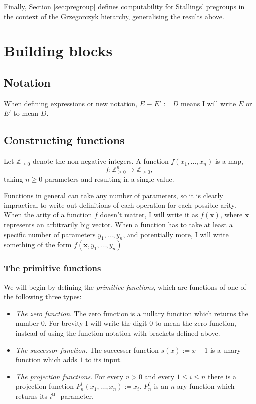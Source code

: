 \documentclass[a4paper]{article}
\newcommand{\ZZ}{\mathbb{Z}}
\newcommand{\ith}{$i^{\textrm{th}}$~}
\newcommand{\xvec}{\mathbf{x}}	%
\theoremstyle{plain}
\theoremstyle{definition}
\begin{document}
Finally, Section \ref{sec:pregroup} defines computability for Stallings' pregroups \cite{Stallings_1971} in the context of the Grzegorczyk hierarchy, generalising the results above.


\section{Building blocks \label{buildingblocks}}

\subsection{Notation}
When defining expressions or new notation, $E \equiv E' := D$ means I will write $E$ or $E'$ to mean $D$.

\subsection{Constructing functions}
Let $\ZZ_{\geq 0}$ denote the non-negative integers. A function $f(x_1, \dots, x_n)$ is a map,
\[f: \ZZ_{\geq 0}^n \rightarrow \ZZ_{\geq 0},\]
taking $n \geq 0$ parameters and resulting in a single value.

Functions in general can take any number of parameters, so it is clearly impractical to write out definitions of each operation for each possible arity. When the arity of a function $f$ doesn't matter, I will write it as $f(\xvec)$, where $\xvec$ represents an arbitrarily big vector.  When a function has to take at least a specific number of parameters $y_1, \dots, y_n$, and potentially more, I will write something of the form $f(\xvec, y_1, \dots, y_n)$

\subsubsection{The primitive functions}

We will begin by defining the {\it primitive functions}, which are functions of one of the following three types:

\begin{itemize}
	\item {\em The zero function}. The zero function is a nullary function which returns the number $0$. For brevity I will write the digit $0$ to mean the zero function, instead of using the function notation with brackets defined above.
	\item {\em The successor function}. The successor function $s(x) := x + 1$ is a unary function which adds $1$ to its input.
	\item {\em The projection functions}. For every $n > 0 $ and every $1 \leq i \leq n$ there is a projection function $P_n^i(x_1, \dots, x_n) := x_i$. $P_n^i$ is an $n$-ary function which returns its \ith parameter.
\end{itemize}
\end{document}
